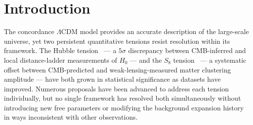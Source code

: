 \documentclass[twocolumn,a4paper,aps,prd,twocolumn,showpacs,notitlepage,superscriptaddress,nofootinbib]{article}
\newcommand{\LCDM}{$\Lambda$CDM}
\begin{document}
\begin{center}
\begin{minipage}{0.80\textwidth}
\begin{abstract}
The resulting perturbation-level modification to $\Lambda$CDM has been
validated against the full Planck 2018 likelihood through 17 converged MCMC
chains (Gelman--Rubin $R - 1 < 0.01$ throughout), yielding
$\Delta\chi^2 = +0.54$ best-fit relative to $\Lambda$CDM under the Planck
CamSpec TTTEEE likelihood --- statistically indistinguishable from the
standard model while simultaneously producing $\sigma_8$ shifting from
$0.809$ to $0.800$, a matter-sector Hubble constant
$H_0^{\mathrm{matter}} = 72.26~\mathrm{km\,s^{-1}\,Mpc^{-1}}$ alongside $H_0^{\mathrm{photon}} = 67.16~\mathrm{km\,s^{-1}\,Mpc^{-1}}$, both within
$1\sigma$ of their respective observational anchors. All standard
cosmological parameters shift by less than $0.1\sigma$. Zero free parameters
beyond $\Lambda$CDM.
Specific falsifiable predictions for Euclid, DESI Year 5, and CMB-S4 are
stated. The data is coming. All chains, modified Boltzmann code,
configuration files, and analysis scripts are publicly archived at the GitHub repository listed above.
\noindent The numbers speak for themselves. We just gave them a better
introduction.

\end{abstract}
\end{minipage}
\end{center}

\thispagestyle{plain}
\clearpage
\twocolumn

\onecolumn
\tableofcontents
\clearpage
\twocolumn


\section{Introduction}
\label{sec:intro}

The concordance \LCDM{} model provides an accurate description of the
large-scale universe, yet two persistent quantitative tensions resist resolution
within its framework.  The Hubble tension~\citep{Riess2022} — a $5\sigma$
discrepancy between CMB-inferred and local distance-ladder measurements of
$H_0$ — and the $S_8$ tension~\citep{Heymans2021,DES2022} — a systematic
offset between CMB-predicted and weak-lensing-measured matter clustering
amplitude — have both grown in statistical significance as datasets have
improved.  Numerous proposals have been advanced to address each tension
individually, but no single framework has resolved both simultaneously without
introducing new free parameters or modifying the background expansion history
in ways inconsistent with other observations.
\end{document}
